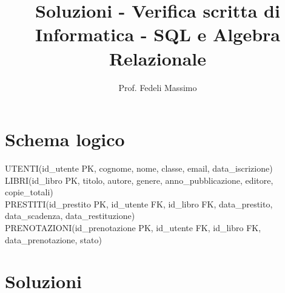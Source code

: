 \documentclass[a4paper,12pt]{article}
\title{Soluzioni - Verifica scritta di Informatica - SQL e Algebra Relazionale}
\author{Prof. Fedeli Massimo}
\date{}
\begin{document}
	\maketitle
	
	\section*{Schema logico}
	
	\begin{flushleft}
		UTENTI(id\_utente PK, cognome, nome, classe, email, data\_iscrizione) \\
		LIBRI(id\_libro PK, titolo, autore, genere, anno\_pubblicazione, editore, copie\_totali) \\
		PRESTITI(id\_prestito PK, id\_utente FK, id\_libro FK, data\_prestito, data\_scadenza, data\_restituzione) \\
		PRENOTAZIONI(id\_prenotazione PK, id\_utente FK, id\_libro FK, data\_prenotazione, stato)
	\end{flushleft}
	
	\section*{Soluzioni}
	
\end{document}

